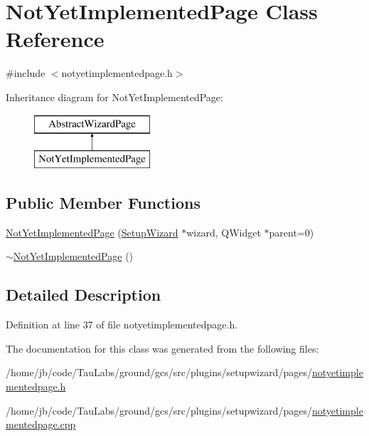 \hypertarget{class_not_yet_implemented_page}{\section{\-Not\-Yet\-Implemented\-Page \-Class \-Reference}
\label{class_not_yet_implemented_page}
}


{\ttfamily \#include $<$notyetimplementedpage.\-h$>$}

\-Inheritance diagram for \-Not\-Yet\-Implemented\-Page\-:\begin{figure}[H]
\begin{center}
\leavevmode
\includegraphics[height=2.000000cm]{class_not_yet_implemented_page}
\end{center}
\end{figure}
\subsection*{\-Public \-Member \-Functions}
\begin{DoxyCompactItemize}
\item 
\hyperlink{group___not_yet_implemented_page_ga2d16a7a61f866fb399f6e888957a8fdc}{\-Not\-Yet\-Implemented\-Page} (\hyperlink{class_setup_wizard}{\-Setup\-Wizard} $\ast$wizard, \-Q\-Widget $\ast$parent=0)
\item 
\hyperlink{group___not_yet_implemented_page_gaddca330fa063b9b729adc5f9eb7f3eeb}{$\sim$\-Not\-Yet\-Implemented\-Page} ()
\end{DoxyCompactItemize}


\subsection{\-Detailed \-Description}


\-Definition at line 37 of file notyetimplementedpage.\-h.



\-The documentation for this class was generated from the following files\-:\begin{DoxyCompactItemize}
\item 
/home/jb/code/\-Tau\-Labs/ground/gcs/src/plugins/setupwizard/pages/\hyperlink{notyetimplementedpage_8h}{notyetimplementedpage.\-h}\item 
/home/jb/code/\-Tau\-Labs/ground/gcs/src/plugins/setupwizard/pages/\hyperlink{notyetimplementedpage_8cpp}{notyetimplementedpage.\-cpp}\end{DoxyCompactItemize}

